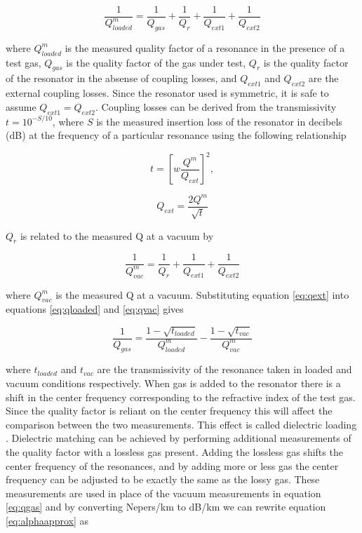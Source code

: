 \begin{equation} \label{eq:qloaded}
\frac{1}{Q_{loaded}^m} = \frac{1}{Q_{gas}} + \frac{1}{Q_{r}} + \frac{1}{Q_{ext1}} +\frac{1}{Q_{ext2}}
\end{equation}

\noindent where $Q_{loaded}^m$ is the measured quality factor of a resonance in the presence of a test gas, $Q_{gas}$ is the quality factor of the gas under test, $Q_{r}$ is the quality factor of the resonator in the absense of coupling losses, and $Q_{ext1}$ and $Q_{ext2}$ are the external coupling losses. Since the resonator used is symmetric, it is safe to assume $Q_{ext1} = Q_{ext2}$. Coupling losses can be derived from the transmissivity $t = 10^{-S/10}$, where $S$ is the measured insertion loss of the resonator in decibels (dB) at the frequency of a particular resonance using the following relationship

\begin{equation} \label{eq:t}
t = \left[ w \frac{Q^m}{Q_{ext}} \right]^2,
\end{equation}

\begin{equation} \label{eq:qext}
Q_{ext} = \frac{2Q^m}{\sqrt{t}}
\end{equation}

\noindent $Q_r$ is related to the measured Q at a vacuum by

\begin{equation}\label{eq:qvac}
\frac{1}{Q_{vac}^m} =  \frac{1}{Q_{r}} + \frac{1}{Q_{ext1}} +\frac{1}{Q_{ext2}}
\end{equation}

\noindent where $Q_{vac}^m$ is the measured Q at a vacuum. Substituting equation \ref{eq:qext} into equations \ref{eq:qloaded} and \ref{eq:qvac} gives

\begin{equation}\label{eq:qgas}
\frac{1}{Q_{gas}} = \frac{1 - \sqrt{t_{loaded}}}{Q^m_{loaded}} - \frac{1-\sqrt{t_{vac}}}{Q_{vac}^m}
\end{equation}

\noindent where $t_{loaded}$ and $t_{vac}$ are the transmissivity of the resonance taken in loaded and vacuum conditions respectively. When gas is added to the resonator there is a shift in the center frequency corresponding to the refractive index of the test gas. Since the quality factor is reliant on the center frequency this will affect the comparison between the two measurements. This effect is called dielectric loading \cite{h2s-labmesurements}. Dielectric matching can be achieved by performing additional measurements of the quality factor with a lossless gas present. Adding the lossless gas shifts the center frequency of the resonances, and by adding more or less gas the center frequency can be adjusted to be exactly the same as the lossy gas. These measurements are used in place of the vacuum measurements in equation \ref{eq:qgas} and by converting Nepers/km to dB/km we can rewrite equation \ref{eq:alphaapprox} as

